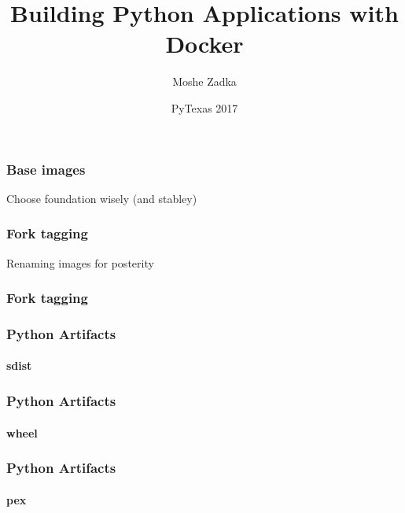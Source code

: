 \documentclass{beamer}
\title{Building Python Applications with Docker}
\author{Moshe Zadka}
\date{PyTexas 2017}
\begin{document}
 
\frame{\titlepage}
 
\begin{frame}
\frametitle{Base images}
Choose foundation wisely (and stabley)
\end{frame}

\begin{frame}
\frametitle{Fork tagging}
Renaming images for posterity
\end{frame}

\begin{frame}[fragile]
\frametitle{Fork tagging}

\end{frame}

\begin{frame}[fragile]
\frametitle{Python Artifacts}
\framesubtitle{sdist}
\end{frame}

\begin{frame}[fragile]
\frametitle{Python Artifacts}
\framesubtitle{wheel}
\end{frame}

\begin{frame}[fragile]
\frametitle{Python Artifacts}
\framesubtitle{pex}
\end{frame}
\end{document}
